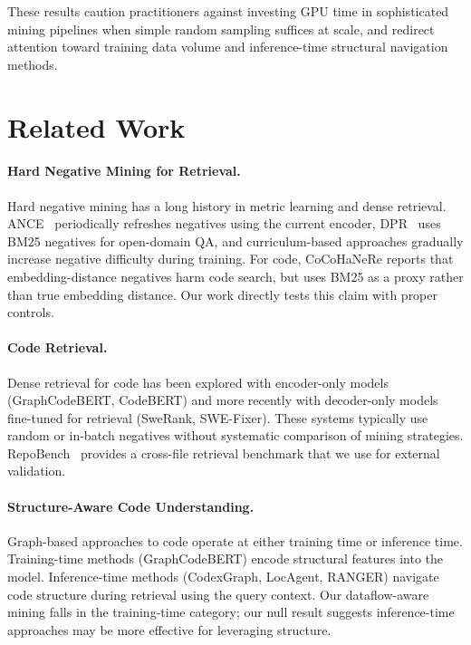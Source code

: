 \documentclass[11pt,a4paper]{article}
\begin{document}
These results caution practitioners against investing GPU time in sophisticated mining pipelines when simple random sampling suffices at scale, and redirect attention toward training data volume and inference-time structural navigation methods.

\section{Related Work}
\label{sec:related}

\paragraph{Hard Negative Mining for Retrieval.}
Hard negative mining has a long history in metric learning and dense retrieval.
ANCE~\cite{xiong2021approximate} periodically refreshes negatives using the current encoder, DPR~\cite{karpukhin2020dense} uses BM25 negatives for open-domain QA, and curriculum-based approaches gradually increase negative difficulty during training.
For code, CoCoHaNeRe reports that embedding-distance negatives harm code search, but uses BM25 as a proxy rather than true embedding distance.
Our work directly tests this claim with proper controls.

\paragraph{Code Retrieval.}
Dense retrieval for code has been explored with encoder-only models (GraphCodeBERT, CodeBERT) and more recently with decoder-only models fine-tuned for retrieval (SweRank, SWE-Fixer).
These systems typically use random or in-batch negatives without systematic comparison of mining strategies.
RepoBench~\cite{liu2023repobench} provides a cross-file retrieval benchmark that we use for external validation.

\paragraph{Structure-Aware Code Understanding.}
Graph-based approaches to code operate at either training time or inference time.
Training-time methods (GraphCodeBERT) encode structural features into the model.
Inference-time methods (CodexGraph, LocAgent, RANGER) navigate code structure during retrieval using the query context.
Our dataflow-aware mining falls in the training-time category; our null result suggests inference-time approaches may be more effective for leveraging structure.
\end{document}
